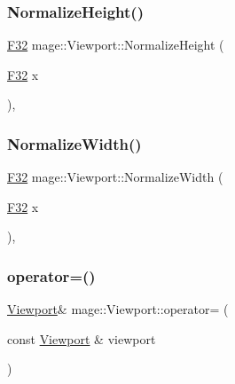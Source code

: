 \hypertarget{classmage_1_1_viewport_a7e8becd79a69371d7f6d513c88b04a5a}{}\label{classmage_1_1_viewport_a7e8becd79a69371d7f6d513c88b04a5a} 
\subsubsection{\texorpdfstring{Normalize\+Height()}{NormalizeHeight()}}
{\footnotesize\ttfamily \hyperlink{namespacemage_aa97e833b45f06d60a0a9c4fc22ae02c0}{F32} mage\+::\+Viewport\+::\+Normalize\+Height (\begin{DoxyParamCaption}\item[{\hyperlink{namespacemage_aa97e833b45f06d60a0a9c4fc22ae02c0}{F32}}]{x }\end{DoxyParamCaption})\hspace{0.3cm}{\ttfamily [static]}, {\ttfamily [noexcept]}}

\hypertarget{classmage_1_1_viewport_a2c00b7da56962f96830fd7626ef85d04}{}\label{classmage_1_1_viewport_a2c00b7da56962f96830fd7626ef85d04} 
\subsubsection{\texorpdfstring{Normalize\+Width()}{NormalizeWidth()}}
{\footnotesize\ttfamily \hyperlink{namespacemage_aa97e833b45f06d60a0a9c4fc22ae02c0}{F32} mage\+::\+Viewport\+::\+Normalize\+Width (\begin{DoxyParamCaption}\item[{\hyperlink{namespacemage_aa97e833b45f06d60a0a9c4fc22ae02c0}{F32}}]{x }\end{DoxyParamCaption})\hspace{0.3cm}{\ttfamily [static]}, {\ttfamily [noexcept]}}

\hypertarget{classmage_1_1_viewport_ab06320c545dd9b71d17e7f8c92fb693c}{}\label{classmage_1_1_viewport_ab06320c545dd9b71d17e7f8c92fb693c} 
\subsubsection{\texorpdfstring{operator=()}{operator=()}\hspace{0.1cm}{\footnotesize\ttfamily [1/2]}}
{\footnotesize\ttfamily \hyperlink{classmage_1_1_viewport}{Viewport}\& mage\+::\+Viewport\+::operator= (\begin{DoxyParamCaption}\item[{const \hyperlink{classmage_1_1_viewport}{Viewport} \&}]{viewport }\end{DoxyParamCaption})\hspace{0.3cm}{\ttfamily [default]}}

